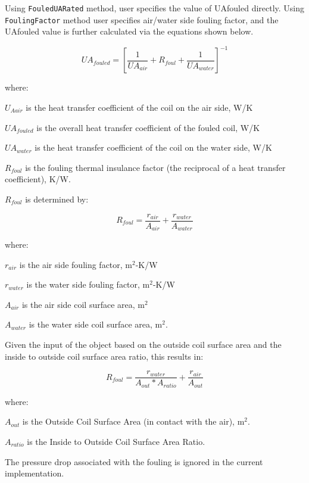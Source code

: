 Using \lstinline!FouledUARated! method, user specifies the value of UAfouled directly. Using \lstinline!FoulingFactor! method user specifies air/water side fouling factor, and the UAfouled value is further calculated via the equations shown below.

\begin{equation}
    UA_{fouled} = [\frac{1}{UA_{air}} + R_{foul} + \frac{1}{UA_{water}}]^{-1}
\end{equation}

where:

\(U_{Aair}\) is the heat transfer coefficient of the coil on the air side, W/K

\(UA_{fouled}\) is the overall heat transfer coefficient of the fouled coil, W/K

\(UA_{water}\) is the heat transfer coefficient of the coil on the water side, W/K

\(R_{foul}\) is the fouling thermal insulance factor (the reciprocal of a heat transfer coefficient), K/W.

\(R_{foul}\) is determined by:

\begin{equation}
    R_{foul} = \frac{r_{air}}{A_{air}} + \frac{r_{water}}{A_{water}}
\end{equation}

where:

\(r_{air}\) is the air side fouling factor, m\(^{2}\)-K/W

\(r_{water}\) is the water side fouling factor, m\(^{2}\)-K/W

\(A_{air}\) is the air side coil surface area, m\(^{2}\)

\(A_{water}\) is the water side coil surface area, m\(^{2}\).

Given the input of the object based on the outside coil surface area and the inside to outside coil surface area ratio, this results in:

\begin{equation}
    R_{foul} = \frac{r_{water}}{A_{out}*A_{ratio}} + \frac{r_{air}}{A_{out}}
\end{equation}

where:

\(A_{out}\) is the Outside Coil Surface Area (in contact with the air), m\(^{2}\).

\(A_{ratio}\) is the Inside to Outside Coil Surface Area Ratio.

The pressure drop associated with the fouling is ignored in the current implementation.

